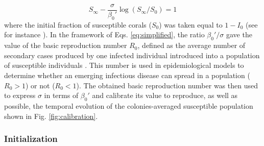 \documentclass[utf8]{frontiersSCNS}
\begin{document}
\begin{equation}
    S_\infty - \frac{\sigma}{\beta_0'}\log(S_{\infty}/S_0) = 1\label{eq:ratio}
\end{equation}
where the initial fraction of susceptible corals ($S_0$) was taken equal to $1-I_0$ (see for instance \cite{Murray07}). In the framework of Eqs. \ref{eq:simplified}, the ratio $\beta_0'/\sigma$ gave the value of the basic reproduction number $R_0$, defined as the average number of secondary cases produced by one infected individual introduced into a population of susceptible individuals \citep{keeling2007stochastic}. This number is used in epidemiological models to determine whether an emerging infectious disease can spread in a population ($R_0 > 1$) or not ($R_0 < 1$). The obtained basic reproduction number was then used to express $\sigma$ in terms of $\beta_0'$ and calibrate its value to reproduce, as well as possible, the temporal evolution of the colonies-averaged susceptible population shown in Fig. \ref{fig:calibration}.

\subsubsection{Initialization} \label{sec:init}
\end{document}
